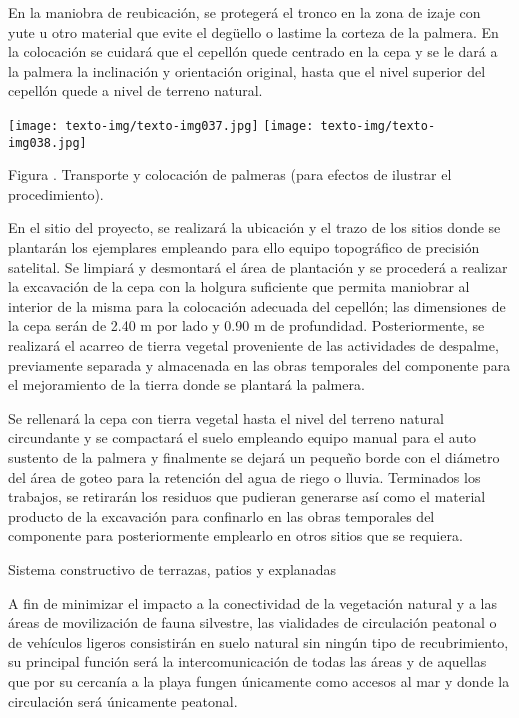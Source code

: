 \documentclass{article}
\newcounter{Figura}
\renewcommand\theFigura{\arabic{Figura}}
\begin{document}
\bigskip

En la maniobra de reubicación, se protegerá el tronco en la zona de izaje con yute u otro material que evite el degüello o lastime la corteza de la palmera. En la colocación se cuidará que el cepellón quede centrado en la cepa y se le dará a la palmera la inclinación y orientación original, hasta que el nivel superior del cepellón quede a nivel de terreno natural.


\bigskip


\bigskip

 \texttt{[image: texto-img/texto-img037.jpg]}   \texttt{[image: texto-img/texto-img038.jpg]} 

Figura \stepcounter{Figura}{\theFigura}. Transporte y colocación de palmeras (para efectos de ilustrar el procedimiento).


\bigskip


\bigskip

En el sitio del proyecto, se realizará la ubicación y el trazo de los sitios donde se plantarán los ejemplares empleando para ello equipo topográfico de precisión satelital. Se limpiará y desmontará el área de plantación y se procederá a realizar la excavación de la cepa con la holgura suficiente que permita maniobrar al interior de la misma para la colocación adecuada del cepellón; las dimensiones de la cepa serán de 2.40 m por lado y 0.90 m de profundidad. Posteriormente, se realizará el acarreo de tierra vegetal proveniente de las actividades de despalme, previamente separada y almacenada en las obras temporales del componente para el mejoramiento de la tierra donde se plantará la palmera. 


\bigskip

Se rellenará la cepa con tierra vegetal hasta el nivel del terreno natural circundante y se compactará el suelo empleando equipo manual para el auto sustento de la palmera y finalmente se dejará un pequeño borde con el diámetro del área de goteo para la retención del agua de riego o lluvia. Terminados los trabajos, se retirarán los residuos que pudieran generarse así como el material producto de la excavación para confinarlo en las obras temporales del componente para posteriormente emplearlo en otros sitios que se requiera.


\bigskip


\bigskip

Sistema constructivo de terrazas, patios y explanadas


\bigskip

A fin de minimizar el impacto a la conectividad de la vegetación natural y a las áreas de movilización de fauna silvestre, las vialidades de circulación peatonal o de vehículos ligeros consistirán en suelo natural sin ningún tipo de recubrimiento, su principal función será la intercomunicación de todas las áreas y de aquellas que por su cercanía a la playa fungen únicamente como accesos al mar y donde la circulación será únicamente peatonal. 
\end{document}
